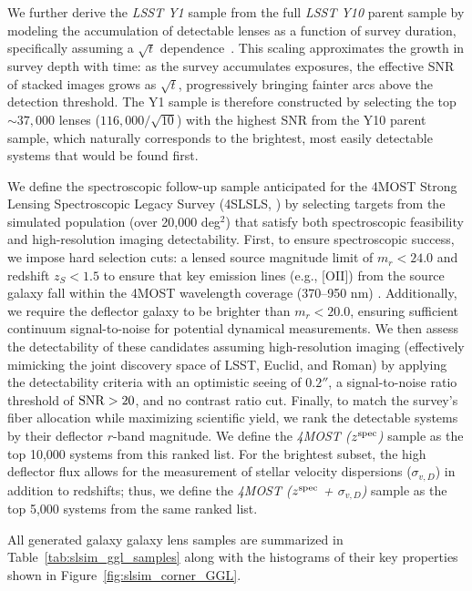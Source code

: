 \documentclass[a4paper,11pt]{article}
\begin{document}
We further derive the \emph{LSST Y1} sample from the full \emph{LSST Y10} parent sample by modeling the accumulation of detectable lenses as a function of survey duration, specifically assuming a $\sqrt{t}$ dependence~\cite{Shajib:2024}. This 
scaling approximates the growth in survey depth with time: as the survey accumulates exposures, the effective SNR of stacked images grows as $\sqrt{t}$, progressively bringing fainter arcs above the detection threshold. The Y1 sample is therefore constructed by selecting the top $\sim 37,000$ lenses ($116,000 / \sqrt{10}$) with the highest SNR from the Y10 parent sample, which naturally corresponds to the brightest, most easily detectable systems that would be found first.

We define the spectroscopic follow-up sample anticipated for the 4MOST Strong Lensing Spectroscopic Legacy Survey (4SLSLS, \cite{Collett_4MOST_SLSLS:2023}) by selecting targets from the simulated population (over 20,000 deg$^2$) that satisfy both spectroscopic feasibility and high-resolution imaging detectability. First, to ensure spectroscopic success, we impose hard selection cuts: a lensed source magnitude limit of $m_{r} < 24.0$ and redshift $z_S < 1.5$ to ensure that key emission lines (e.g., [OII]) from the source galaxy fall within the 4MOST wavelength coverage (370–950 nm) \cite{Collett_4MOST_SLSLS:2023, Li:2024}. Additionally, we require the deflector galaxy to be brighter than $m_{r} < 20.0$, ensuring sufficient continuum signal-to-noise for potential dynamical measurements. 
We then assess the detectability of these candidates assuming high-resolution imaging (effectively mimicking the joint discovery space of LSST, Euclid, and Roman) by applying the \cite{Collett:2015} detectability criteria with an optimistic seeing of $0.2''$, a signal-to-noise ratio threshold of ${\rm SNR} > 20$, and no contrast ratio cut.
Finally, to match the survey's fiber allocation while maximizing scientific yield, we rank the detectable systems by their deflector $r$-band magnitude. We define the \emph{4MOST ($z^{\rm spec}$)} sample as the top 10,000 systems from this ranked list. For the brightest subset, the high deflector flux allows for the measurement of stellar velocity dispersions ($\sigma_{v, D}$) in addition to redshifts; thus, we define the \emph{4MOST ($z^{\rm spec}$ + $\sigma_{v, D}$)} sample as the top 5,000 systems from the same ranked list.

All generated galaxy galaxy lens samples are summarized in Table~\ref{tab:slsim_ggl_samples} along with the histograms of their key properties shown in Figure~\ref{fig:slsim_corner_GGL}.
\end{document}
